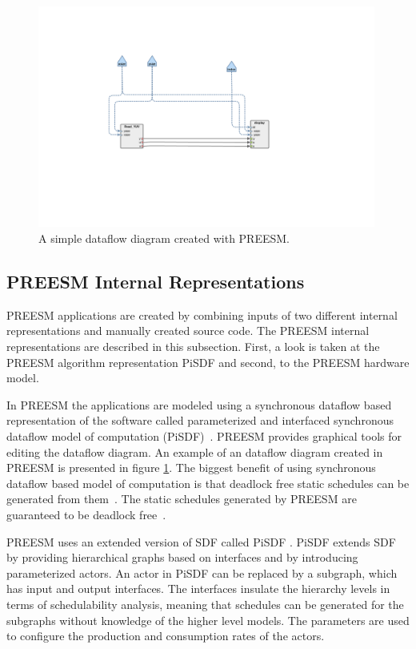 \begin{figure}[h!]
    \begin{center}
        \includegraphics[width=0.99\textwidth]{images/example_preesm_diagram.png}
        \caption{A simple dataflow diagram created with PREESM.}
        \label{fig:preesm_example}
    \end{center}
\end{figure}

\subsection{PREESM Internal Representations}
\label{subsec:preesm-internal}
PREESM applications are created by combining inputs of two different internal representations and manually created source code. The PREESM internal representations are described in this subsection. First, a look is taken at the PREESM algorithm representation PiSDF and second, to the PREESM hardware model.

In PREESM the applications are modeled using a synchronous dataflow based representation of the software called parameterized and interfaced synchronous dataflow model of computation (PiSDF)~\cite{pelcat2014preesm}. PREESM provides graphical tools for editing the dataflow diagram. An example of an dataflow diagram created in PREESM is presented in figure \ref{fig:preesm_example}. The biggest benefit of using synchronous dataflow based model of computation is that deadlock free static schedules can be generated from them~\cite{pelcat2014preesm}. The static schedules generated by PREESM are guaranteed to be deadlock free~\cite{preesm}.

PREESM uses an extended version of SDF called PiSDF \cite{pelcat2014preesm}. PiSDF extends SDF by providing hierarchical graphs based on interfaces and by introducing parameterized actors. An actor in PiSDF can be replaced by a subgraph, which has input and output interfaces. The interfaces insulate the hierarchy levels in terms of schedulability analysis, meaning that schedules can be generated for the subgraphs without knowledge of the higher level models. The parameters are used to configure the production and consumption rates of the actors.~\cite{desnos2013pimm}

